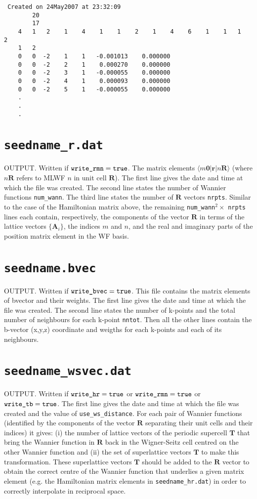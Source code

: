 \begin{verbatim}
 Created on 24May2007 at 23:32:09                            
        20
        17
    4   1   2    1    4    1    1    2    1    4    6    1    1   1   2
    1   2
    0   0  -2    1    1   -0.001013    0.000000
    0   0  -2    2    1    0.000270    0.000000
    0   0  -2    3    1   -0.000055    0.000000
    0   0  -2    4    1    0.000093    0.000000
    0   0  -2    5    1   -0.000055    0.000000
    .
    .
    .
\end{verbatim}

\section{{\tt seedname\_r.dat}}
OUTPUT.
Written if $\verb#write_rmn#=\verb#true#$. The matrix elements
$\langle m\mathbf{0}|\mathbf{r}|n\mathbf{R}\rangle$ (where $n\mathbf{R}$ refers to MLWF $n$ in unit cell $\mathbf{R}$). The first line gives the date and time at which the file was created. 
The second line states the number of Wannier functions {\tt num\_wann}. 
The third line states the number of $\mathbf{R}$ vectors {\tt nrpts}. 
Similar to the case of the Hamiltonian matrix above, the 
remaining {\tt num\_wann}$^2 \times$ {\tt nrpts} lines
each contain, respectively, the components of the vector $\mathbf{R}$
in terms of the lattice vectors $\{\mathbf{A}_{i}\}$, the indices $m$
and $n$, and the real and imaginary parts of the position matrix element
in the WF basis.

\section{{\tt seedname.bvec}}
OUTPUT.
Written if $\verb#write_bvec#=\verb#true#$. This file contains 
the matrix elements of bvector and their weights.
The first line gives the date and time at which the file was created.
The second line states the number of k-points and 
the total number of neighbours for each k-point {\tt nntot}.
Then all the other lines contain the b-vector (x,y,z) coordinate and weigths
for each k-points and each of its neighbours. 

\section{{\tt seedname\_wsvec.dat}}
OUTPUT.
Written if $\verb#write_hr#=\verb#true#$ or $\verb#write_rmn#=\verb#true#$ or $\verb#write_tb#=\verb#true#$. The first line gives the date and
time at which the file was created and the value of {\tt use\_ws\_distance}. 
For each pair of Wannier functions (identified by the components of the vector $\mathbf{R}$ separating their unit cells and their indices) it gives: (i) the number of lattice vectors of the periodic supercell $\mathbf{T}$ that bring the Wannier function in $\mathbf{R}$ back in the Wigner-Seitz cell centred on the other Wannier function and (ii) the set of superlattice vectors $\mathbf{T}$ to make this transformation. 
These superlattice vectors $\mathbf{T}$ should be added to the $\mathbf{R}$ vector to obtain the correct centre of the Wannier function that underlies a given matrix element (e.g. the Hamiltonian matrix elements in {\tt seedname\_hr.dat}) in order to correctly interpolate in reciprocal space.

